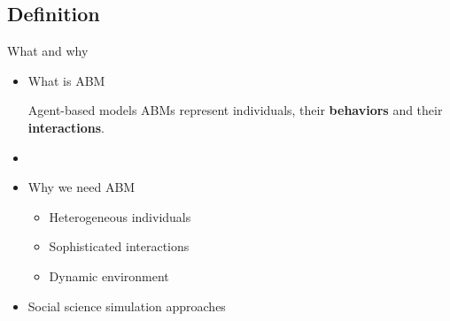 \documentclass[compress]{beamer}
\begin{document}
\subsection{Definition}
\begin{frame}{What and why}
    \begin{itemize}
        \item<1-> What is ABM
            \begin{center}
                \begin{minipage}{10.3cm}
                \begin{block}{Agent-based models}
                    ABMs represent individuals, their \textbf{behaviors} and their \textbf{interactions}.
                \end{block}
                \end{minipage}
            \end{center}
        \item[] %
        \item<2-> Why we need ABM
            \begin{itemize}
                \item Heterogeneous individuals
                \item Sophisticated interactions
                \item Dynamic environment
            \end{itemize}
        \item<3> Social science simulation approaches\cite{gilbert2005simulation}
    \end{itemize}
\end{frame}
\end{document}
